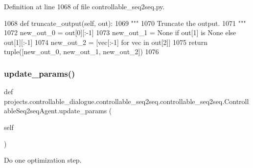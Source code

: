 Definition at line 1068 of file controllable\+\_\+seq2seq.\+py.


\begin{DoxyCode}
1068     \textcolor{keyword}{def }truncate\_output(self, out):
1069         \textcolor{stringliteral}{"""}
1070 \textcolor{stringliteral}{        Truncate the output.}
1071 \textcolor{stringliteral}{        """}
1072         new\_out\_0 = out[0][:-1]
1073         new\_out\_1 = \textcolor{keywordtype}{None} \textcolor{keywordflow}{if} out[1] \textcolor{keywordflow}{is} \textcolor{keywordtype}{None} \textcolor{keywordflow}{else} out[1][:-1]
1074         new\_out\_2 = [vec[:-1] \textcolor{keywordflow}{for} vec \textcolor{keywordflow}{in} out[2]]
1075         \textcolor{keywordflow}{return} tuple([new\_out\_0, new\_out\_1, new\_out\_2])
1076 
\end{DoxyCode}
\mbox{\label{classprojects_1_1controllable__dialogue_1_1controllable__seq2seq_1_1controllable__seq2seq_1_1ControllableSeq2seqAgent_a9d5a1ac61fa3ebf363a8b15106a7e08b}} 
\subsubsection{\texorpdfstring{update\+\_\+params()}{update\_params()}}
{\footnotesize\ttfamily def projects.\+controllable\+\_\+dialogue.\+controllable\+\_\+seq2seq.\+controllable\+\_\+seq2seq.\+Controllable\+Seq2seq\+Agent.\+update\+\_\+params (\begin{DoxyParamCaption}\item[{}]{self }\end{DoxyParamCaption})}

\begin{DoxyVerb}Do one optimization step.
\end{DoxyVerb}
 

